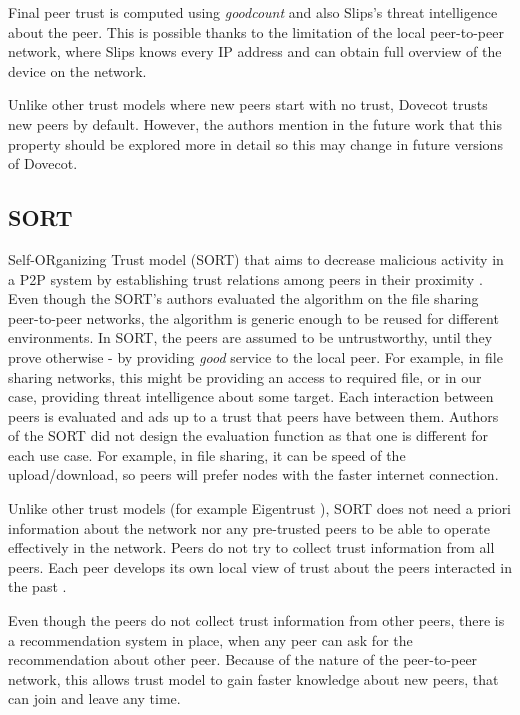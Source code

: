 Final peer trust is computed using \textit{goodcount} and also Slips's threat intelligence about the peer. 
This is possible thanks to the limitation of the local peer-to-peer network, where Slips knows every IP address and can obtain full overview of the device on the network.

Unlike other trust models where new peers start with no trust, Dovecot trusts new peers by default. 
However, the authors mention in the future work that this property should be explored more in detail so this may change in future versions of Dovecot.

\subsection{SORT}
\label{subsec:sort}
Self-ORganizing Trust model (SORT) that aims to decrease malicious activity in a P2P system by establishing trust relations among peers in their proximity \cite{sort}.
Even though the SORT's authors evaluated the algorithm on the file sharing peer-to-peer networks, the algorithm is generic enough to be reused for different environments.
In SORT, the peers are assumed to be untrustworthy, until they prove otherwise - by providing \textit{good} service to the local peer. 
For example, in file sharing networks, this might be providing an access to required file, or in our case, providing threat intelligence about some target.
Each interaction between peers is evaluated and ads up to a trust that peers have between them. 
Authors of the SORT did not design the evaluation function as that one is different for each use case. 
For example, in file sharing, it can be speed of the upload/download, so peers will prefer nodes with the faster internet connection.

Unlike other trust models (for example Eigentrust \cite{kamvar2003eigentrust}), SORT does not need a priori information about the network nor any pre-trusted peers to be able to operate effectively in the network.
Peers do not try to collect trust information from all peers.
Each peer develops its own local view of trust about the peers interacted in the past \cite{sort}.

Even though the peers do not collect trust information from other peers, there is a recommendation system in place, when any peer can ask for the recommendation about other peer.
Because of the nature of the peer-to-peer network, this allows trust model to gain faster knowledge about new peers, that can join and leave any time.

